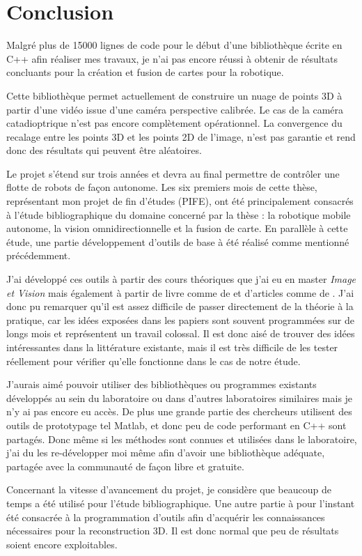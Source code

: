 \section{Conclusion}

Malgré plus de 15000 lignes de code pour le début d'une bibliothèque écrite en C++ afin réaliser mes travaux, je n'ai pas encore réussi à obtenir de résultats concluants pour la création et fusion de cartes pour la robotique.

Cette bibliothèque permet actuellement de construire un nuage de points 3D à partir d'une vidéo issue d'une caméra perspective calibrée.
Le cas de la caméra catadioptrique n'est pas encore complètement opérationnel.
La convergence du recalage entre les points 3D et les points 2D de l'image, n'est pas garantie et rend donc des résultats qui peuvent être aléatoires.

Le projet s'étend sur trois années et devra au final permettre de contrôler une flotte de robots de façon autonome.
Les six premiers mois de cette thèse, représentant mon projet de fin d'études (PIFE), ont été principalement consacrés à l'étude bibliographique du domaine concerné par la thèse : la robotique mobile autonome, la vision omnidirectionnelle et la fusion de carte.
En parallèle à cette étude, une partie développement d'outils de base à été réalisé comme mentionné précédemment.

J'ai développé ces outils à partir des cours théoriques que j'ai eu en master \emph{Image et Vision} mais également à partir de livre comme 
 de \citeauthor{Hartley03Book} \cite{Hartley03Book} 
et d'articles comme  de \citeauthor{Puig08} \cite{Puig08}.
J'ai donc pu remarquer qu'il est assez difficile de passer directement de la théorie à la pratique, car les idées exposées dans les papiers sont souvent programmées sur de longs mois et représentent un travail colossal.
Il est donc aisé de trouver des idées intéressantes dans la littérature existante, mais il est très difficile de les tester réellement pour vérifier qu'elle fonctionne dans le cas de notre étude.

J'aurais aimé pouvoir utiliser des bibliothèques ou programmes existants développés au sein du laboratoire ou dans d'autres laboratoires similaires mais je n'y ai pas encore eu accès.
De plus une grande partie des chercheurs utilisent des outils de prototypage tel Matlab, et donc peu de code performant en C++ sont partagés.
Donc même si les méthodes sont connues et utilisées dans le laboratoire, j'ai du les re-développer moi même afin d'avoir une bibliothèque adéquate, partagée avec la communauté de façon libre et gratuite.


Concernant la vitesse d'avancement du projet, je considère que beaucoup de temps a été utilisé pour l'étude bibliographique.
Une autre partie à pour l'instant été consacrée à la programmation d'outils afin d'acquérir les connaissances nécessaires pour la reconstruction 3D.
Il est donc normal que peu de résultats soient encore exploitables.


